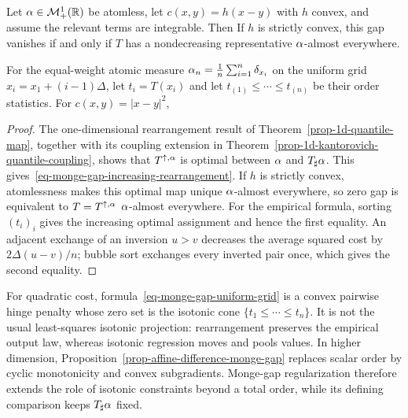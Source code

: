 \begin{prop}\label{prop-monge-gap-one-dimensional}
	Let $\alpha\in\mathcal{M}_+^1(\mathbb{R})$ be atomless, let $c(x,y)=h(x-y)$ with $h$ convex, and assume the relevant terms are integrable. Then
	If $h$ is strictly convex, this gap vanishes if and only if $T$ has a nondecreasing representative $\alpha$-almost everywhere.

	For the equal-weight atomic measure $\alpha_n=\frac1n\sum_{i=1}^n\delta_{x_i}$ on the uniform grid $x_i=x_1+(i-1)\Delta$, let $t_i=T(x_i)$ and let $t_{(1)}\leq\cdots\leq t_{(n)}$ be their order statistics. For $c(x,y)=|x-y|^2$,
\end{prop}
\begin{proof}
	The one-dimensional rearrangement result of Theorem~\ref{prop-1d-quantile-map}, together with its coupling extension in Theorem~\ref{prop-1d-kantorovich-quantile-coupling}, shows that $T^{\uparrow,\alpha}$ is optimal between $\alpha$ and $T_\sharp\alpha$. This gives~\eqref{eq-monge-gap-increasing-rearrangement}. If $h$ is strictly convex, atomlessness makes this optimal map unique $\alpha$-almost everywhere, so zero gap is equivalent to $T=T^{\uparrow,\alpha}$ $\alpha$-almost everywhere. For the empirical formula, sorting $(t_i)_i$ gives the increasing optimal assignment and hence the first equality. An adjacent exchange of an inversion $u>v$ decreases the average squared cost by $2\Delta(u-v)/n$; bubble sort exchanges every inverted pair once, which gives the second equality.
\end{proof}

For quadratic cost, formula~\eqref{eq-monge-gap-uniform-grid} is a convex pairwise hinge penalty whose zero set is the isotonic cone $\{t_1\leq\cdots\leq t_n\}$. It is not the usual least-squares isotonic projection: rearrangement preserves the empirical output law, whereas isotonic regression moves and pools values. In higher dimension, Proposition~\ref{prop-affine-difference-monge-gap} replaces scalar order by cyclic monotonicity and convex subgradients. Monge-gap regularization therefore extends the role of isotonic constraints beyond a total order, while its defining comparison keeps $T_\sharp\alpha$ fixed.

